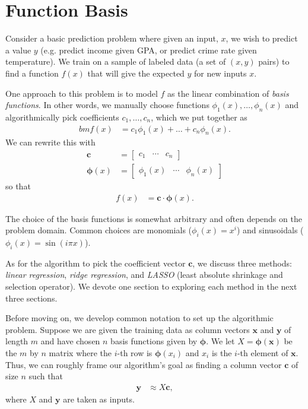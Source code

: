 \documentclass[10pt]{paper}
\begin{document}
\section{Function Basis}
Consider a basic prediction problem where given an input, $x$, we wish to predict a value $y$ (e.g. predict income given GPA, or predict crime rate given temperature). We train on a sample of labeled data (a set of $(x,y)$ pairs) to find a function $f(x)$ that will give the expected $y$ for new inputs $x$.

One approach to this problem is to model $f$ as the linear combination of \emph{basis functions}. In other words, we manually choose functions $\phi_1(x), \dots, \phi_n(x)$ and algorithmically pick coefficients $c_1, \dots, c_n$, which we put together as
\begin{align*}bm
f(x) &= c_1 \phi_1(x) + \dots + c_n \phi_n(x).
\end{align*}
We can rewrite this with 
\begin{align*}
\bm{c} &= \begin{bmatrix} c_1 & \cdots & c_n \end{bmatrix} \\
\bm{\phi}(x) &= \begin{bmatrix} \phi_1(x) & \cdots & \phi_n(x) \end{bmatrix}
\end{align*}
so that 
\begin{align}
f(x) &= \bm{c} \cdot \bm{\phi}(x). \label{eq:predictor}
\end{align}

The choice of the basis functions is somewhat arbitrary and often depends on the problem domain. Common choices are monomials ($\phi_i(x) = x^i$) and sinusoidals ($\phi_i(x) = \sin(i \pi x)$).

As for the algorithm to pick the coefficient vector $\bm{c}$, we discuss three methods: \emph{linear regression}, \emph{ridge regression}, and \emph{LASSO} (least absolute shrinkage and selection operator). We devote one section to exploring each method in the next three sections.

Before moving on, we develop common notation to set up the algorithmic problem. Suppose we are given the training data as column vectors $\bm{x}$ and $\bm{y}$ of length $m$ and have chosen $n$ basis functions given by $\bm{\phi}$. We let $X = \bm{\phi}(\bm{x})$ be the $m$ by $n$ matrix where the $i$-th row is $\bm{\phi}(x_i)$ and $x_i$ is the $i$-th element of $\bm{x}$. Thus, we can roughly frame our algorithm's goal as finding a column vector $\bm{c}$ of size $n$ such that
\begin{align}
\bm{y} &\approx X \bm{c}, \label{eq:problem}
\end{align}
where $X$ and $\bm{y}$ are taken as inputs.
\end{document}
